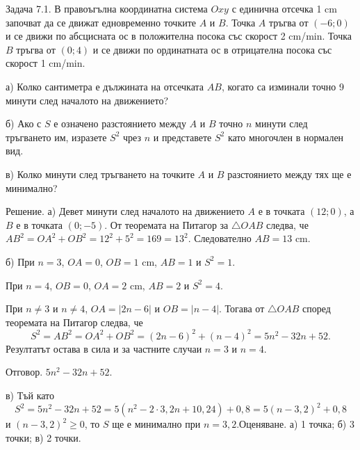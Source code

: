 
Задача 7.1. В правоъгълна координатна система $Oxy$ с единична отсечка 1 cm започват да се движат едновременно точките $A$ и $B$. Точка $A$ тръгва от $(-6;0)$ и се движи по абсцисната ос в положителна посока със скорост 2 cm/min. Точка $B$ тръгва от $(0;4)$ и се движи по ординатната ос в отрицателна посока със скорост 1 cm/min.

а) Колко сантиметра е дължината на отсечката $AB$, когато са изминали точно 9 минути след началото на движението?

б) Ако с $S$ е означено разстоянието между $A$ и $B$ точно $n$ минути след тръгването им, изразете $S^2$ чрез $n$ и представете $S^2$ като многочлен в нормален вид.

в) Колко минути след тръгването на точките $A$ и $B$ разстоянието между тях ще е минимално?

Решение. а) Девет минути след началото на движението $A$ е в точката $(12;0)$, а $B$ е в точката $(0;-5)$. От теоремата на Питагор за $\triangle OAB$ следва, че $AB^2=OA^2+OB^2=12^2+5^2=169=13^2$. Следователно $AB=13$ cm.

б) При $n=3$, $OA=0$, $OB=1$ cm, $AB=1$ и $S^2=1$.

При $n=4$, $OB=0$, $OA=2$ cm, $AB=2$ и $S^2=4$.

При $n\ne3$ и $n\ne4$, $OA=|2n-6|$ и $OB=|n-4|$. Тогава от $\triangle OAB$ според теоремата на Питагор следва, че
$$
S^2=AB^2=OA^2+OB^2=(2n-6)^2+(n-4)^2=5n^2-32n+52.
$$
Резултатът остава в сила и за частните случаи $n=3$ и $n=4$.

Отговор. $5n^2-32n+52$.

в) Тъй като
$$
S^2=5n^2-32n+52=5(n^2-2\cdot3{,}2n+10{,}24)+0{,}8=5(n-3{,}2)^2+0{,}8
$$
и $(n-3{,}2)^2\ge0$, то $S$ ще е минимално при $n=3{,}2$.Оценяване. а) 1 точка; б) 3 точки; в) 2 точки.

